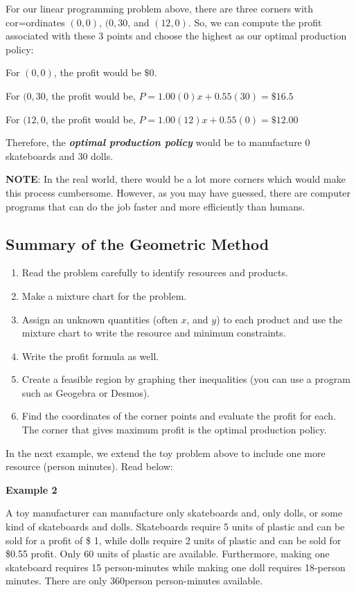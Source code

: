 \documentclass[
  letterpaper,
  DIV=11,
  numbers=noendperiod]{scrreprt}
\providecommand{\tightlist}{%
  \setlength{\itemsep}{0pt}\setlength{\parskip}{0pt}}\usepackage{longtable,booktabs,array}
\begin{document}
For our linear programming problem above, there are three corners with
cor=ordinates \((0,0)\), \((0,30\), and \((12,0)\). So, we can compute
the profit associated with these 3 points and choose the highest as our
optimal production policy:

For \((0,0)\), the profit would be \(\$0\).

For \((0,30\), the profit would be, \(P=1.00 (0)x+0.55(30)=\$16.5\)

For \((12,0\), the profit would be, \(P=1.00 (12)x+0.55(0)=\$12.00\)

Therefore, the \textbf{\emph{optimal production policy}} would be to
manufacture 0 skateboards and 30 dolls.

\textbf{NOTE}: In the real world, there would be a lot more corners
which would make this process cumbersome. However, as you may have
guessed, there are computer programs that can do the job faster and more
efficiently than humans.

\hypertarget{summary-of-the-geometric-method}{%
\subsection{Summary of the Geometric
Method}\label{summary-of-the-geometric-method}}

\begin{enumerate}
\def\labelenumi{\arabic{enumi}.}
\tightlist
\item
  Read the problem carefully to identify resources and products.
\item
  Make a mixture chart for the problem.
\item
  Assign an unknown quantities (often \(x\), and \(y\)) to each product
  and use the mixture chart to write the resource and minimum
  constraints.
\item
  Write the profit formula as well.
\item
  Create a feasible region by graphing ther inequalities (you can use a
  program such as Geogebra or Desmos).
\item
  Find the coordinates of the corner points and evaluate the profit for
  each. The corner that gives maximum profit is the optimal production
  policy.
\end{enumerate}

In the next example, we extend the toy problem above to include one more
resource (person minutes). Read below:

\textbf{Example 2}

A toy manufacturer can manufacture only skateboards and, only dolls, or
some kind of skateboards and dolls. Skateboards require 5 units of
plastic and can be sold for a profit of \$ 1, while dolls require 2
units of plastic and can be sold for \$0.55 profit. Only 60 units of
plastic are available. Furthermore, making one skateboard requires 15
person-minutes while making one doll requires 18-person minutes. There
are only 360person person-minutes available.
\end{document}
